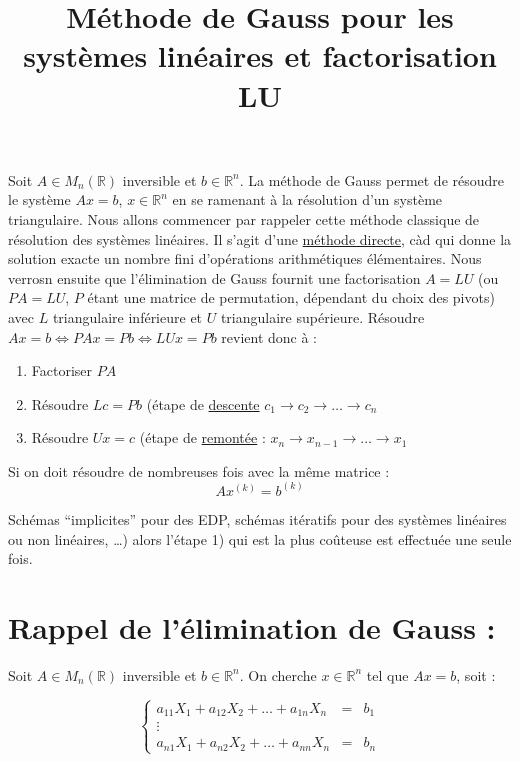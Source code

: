 \documentclass[a4paper,11pt]{article}
\title{\huge \bfseries Méthode de Gauss pour les systèmes linéaires et factorisation LU}
\date{}
\newcommand{\R}{\mathbb{R}}
\theoremstyle{plain} %
\begin{document}
\maketitle

Soit $A \in M_n(\R)$ inversible et $b \in \R^n$. La méthode de Gauss permet de résoudre le système $Ax=b$, $x \in \R^n$ en se ramenant à la résolution d'un système triangulaire.
Nous allons commencer par rappeler cette méthode classique de résolution des systèmes linéaires. Il s'agit d'une \underline{méthode directe}, càd qui donne la solution exacte un nombre fini d'opérations arithmétiques élémentaires.
Nous verrosn ensuite que l'élimination de Gauss fournit une factorisation $A = LU$ (ou $PA = LU$, $P$ étant une matrice de permutation, dépendant du choix des pivots)
avec $L$ triangulaire inférieure et $U$ triangulaire supérieure.
Résoudre $Ax=b \Leftrightarrow PAx = Pb \Leftrightarrow LUx = Pb$ revient donc à :

\begin{enumerate}
    \item Factoriser $PA$
    \item Résoudre $Lc = Pb$ (étape de \underline{descente} $c_1 \to c_2 \to \dots \to c_n$
    \item Résoudre $Ux = c$ (étape de \underline{remontée} : $x_n \to x_{n-1} \to \dots \to x_1$
\end{enumerate}

Si on doit résoudre de nombreuses fois avec la même matrice :
\[
    Ax^{(k)}=b^{(k)}
\]

Schémas ``implicites'' pour des EDP, schémas itératifs pour des systèmes linéaires ou non linéaires, \dots) alors l'étape 1) qui est la plus coûteuse est effectuée une seule fois.


\section{Rappel de l'élimination de Gauss :}

Soit $A \in M_n(\R)$ inversible et $b \in \R^n$. On cherche $x \in \R^n$ tel que $Ax=b$, soit :

\begin{equation}
    \left\lbrace
    \begin{array}{ccc}
        a_{11}X_1 + a_{12}X_2+ \dots+ a_{1n}X_n & = & b_1 \\
        \vdots \\
        a_{n1}X_1 + a_{n2}X_2 + \dots + a_{nn}X_n & = & b_n
    \end{array}\right.
\end{equation}
\end{document}
